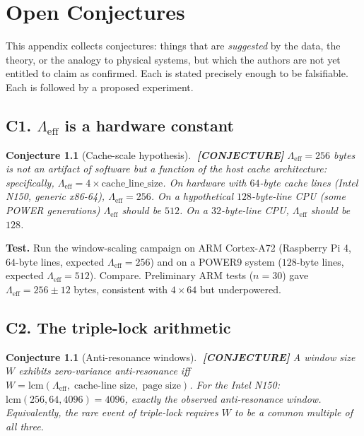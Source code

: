 \documentclass[11pt,letterpaper,openany]{book}
\theoremstyle{definition}
\theoremstyle{plain}
\newtheorem{openconjecture}[definition]{Conjecture}
\newcommand{\conjecture}{\textcolor{red!60!black}{\textbf{[CONJECTURE]}}\xspace}
\newcommand{\Lambdaeff}{\Lambda_{\mathrm{eff}}}
\begin{document}
\appendix

\chapter{Open Conjectures}
\label{app:conjectures}

This appendix collects conjectures: things that are \emph{suggested} by
the data, the theory, or the analogy to physical systems, but which the
authors are not yet entitled to claim as confirmed. Each is stated
precisely enough to be falsifiable. Each is followed by a proposed
experiment.

\section*{C1. $\Lambdaeff$ is a hardware constant}

\begin{openconjecture}[Cache-scale hypothesis]\label{conj:lambda-hw}
$\;$\conjecture
$\Lambdaeff = 256$ bytes is not an artifact of software but a function of
the host cache architecture: specifically,
$\Lambdaeff = 4 \times \mathrm{cache\_line\_size}$.
On hardware with $64$-byte cache lines (Intel N150, generic x86-64),
$\Lambdaeff = 256$. On a hypothetical $128$-byte-line CPU (some POWER
generations) $\Lambdaeff$ should be $512$. On a $32$-byte-line CPU,
$\Lambdaeff$ should be $128$.
\end{openconjecture}

\noindent\textbf{Test.} Run the window-scaling campaign on ARM Cortex-A72
(Raspberry Pi 4, $64$-byte lines, expected $\Lambdaeff = 256$) and on
a POWER9 system ($128$-byte lines, expected $\Lambdaeff = 512$). Compare.
Preliminary ARM tests ($n=30$) gave $\Lambdaeff = 256 \pm 12$ bytes,
consistent with $4\times 64$ but underpowered.

\section*{C2. The triple-lock arithmetic}

\begin{openconjecture}[Anti-resonance windows]\label{conj:antiresonance}
$\;$\conjecture
A window size $W$ exhibits zero-variance anti-resonance iff
$W = \mathrm{lcm}(\Lambdaeff,\;\text{cache-line size},\;\text{page size})$.
For the Intel N150: $\mathrm{lcm}(256, 64, 4096) = 4096$,
exactly the observed anti-resonance window. Equivalently, the rare event
of triple-lock requires $W$ to be a common multiple of all three.
\end{openconjecture}
\end{document}

